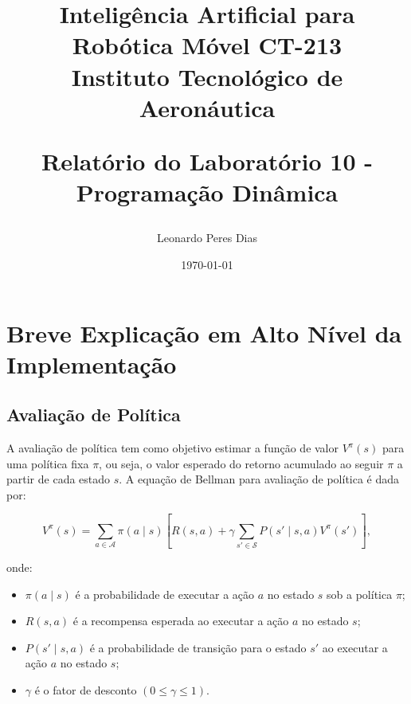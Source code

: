\documentclass[a4paper,12pt]{article}
\title{
    \textbf{Inteligência Artificial para Robótica Móvel CT-213}\\
    \Large Instituto Tecnológico de Aeronáutica 

    \textbf{Relatório do Laboratório 10 - Programação Dinâmica}\\
}
\author{
    Leonardo Peres Dias 
}
\date{\today}
\begin{document}
\BgThispage
\maketitle
\thispagestyle{empty} %


\newpage
\NoBgThispage %

\tableofcontents

\newpage
\NoBgThispage %

\section{Breve Explicação em Alto Nível da Implementação}

\subsection{Avaliação de Política}

A avaliação de política tem como objetivo estimar a função de valor $V^\pi(s)$ para uma política fixa $\pi$, ou seja, o valor esperado do retorno acumulado ao seguir $\pi$ a partir de cada estado $s$. A equação de Bellman para avaliação de política é dada por:

\begin{equation}
V^\pi(s) = \sum_{a \in \mathcal{A}} \pi(a \mid s) \left[ R(s, a) + \gamma \sum_{s' \in \mathcal{S}} P(s' \mid s, a) V^\pi(s') \right],
\end{equation}

onde:
\begin{itemize}
  \item $\pi(a \mid s)$ é a probabilidade de executar a ação $a$ no estado $s$ sob a política $\pi$;
  \item $R(s, a)$ é a recompensa esperada ao executar a ação $a$ no estado $s$;
  \item $P(s' \mid s, a)$ é a probabilidade de transição para o estado $s'$ ao executar a ação $a$ no estado $s$;
  \item $\gamma$ é o fator de desconto $(0 \leq \gamma \leq 1)$.
\end{itemize}
\end{document}
